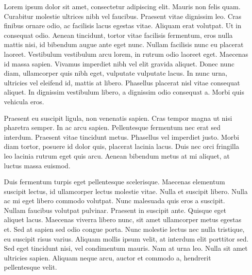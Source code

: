 \documentclass[english]{tktltiki}
\begin{document}
Lorem ipsum dolor sit amet, consectetur adipiscing elit. Mauris non felis quam. Curabitur molestie ultrices nibh vel faucibus. Praesent vitae dignissim leo. Cras finibus ornare odio, ac facilisis lacus egestas vitae. Aliquam erat volutpat. Ut in consequat odio. Aenean tincidunt, tortor vitae facilisis fermentum, eros nulla mattis nisi, id bibendum augue ante eget nunc. Nullam facilisis nunc eu placerat laoreet. Vestibulum vestibulum arcu lorem, in rutrum odio laoreet eget. Maecenas id massa sapien. Vivamus imperdiet nibh vel elit gravida aliquet. Donec nunc diam, ullamcorper quis nibh eget, vulputate vulputate lacus. In nunc urna, ultricies vel eleifend id, mattis at libero. Phasellus placerat nisl vitae consequat aliquet. In dignissim vestibulum libero, a dignissim odio consequat a. Morbi quis vehicula eros.

Praesent eu suscipit ligula, non venenatis sapien. Cras tempor magna ut nisi pharetra semper. In ac arcu sapien. Pellentesque fermentum nec erat sed interdum. Praesent vitae tincidunt metus. Phasellus vel imperdiet justo. Morbi diam tortor, posuere id dolor quis, placerat lacinia lacus. Duis nec orci fringilla leo lacinia rutrum eget quis arcu. Aenean bibendum metus at mi aliquet, at luctus massa euismod.

Duis fermentum turpis eget pellentesque scelerisque. Maecenas elementum suscipit lectus, id ullamcorper lectus molestie vitae. Nulla et suscipit libero. Nulla ac mi eget libero commodo volutpat. Nunc malesuada quis eros a suscipit. Nullam faucibus volutpat pulvinar. Praesent in suscipit ante. Quisque eget aliquet lacus. Maecenas viverra libero nunc, sit amet ullamcorper metus egestas et. Sed at sapien sed odio congue porta. Nunc molestie lectus nec nulla tristique, eu suscipit risus varius. Aliquam mollis ipsum velit, at interdum elit porttitor sed. Sed eget tincidunt nisi, vel condimentum mauris. Nam at urna leo. Nulla sit amet ultricies sapien. Aliquam neque arcu, auctor et commodo a, hendrerit pellentesque velit.

\pagebreak

%
%


\nocite{*}
%
%
%

%





\lastpage

\appendices

\pagestyle{empty}
\end{document}

